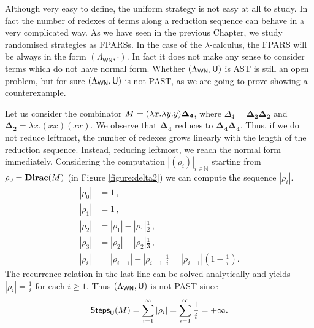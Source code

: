Although very easy to define, the uniform strategy is not easy at all to study. In fact the number of redexes of terms along a reduction sequence can behave in a very complicated way. As we have seen in the previous Chapter, we study randomised strategies as FPARSs. In the case of the $\lambda$-calculus, the FPARS will be always in the form $(\Lambda_\mathsf{WN},\cdot)$. In fact it does not make any sense to consider terms which do not have normal form. Whether $(\Lambda_\mathsf{WN},\mathsf{U})$ is AST is still an open problem, but for sure $(\Lambda_\mathsf{WN},\mathsf{U})$ is not PAST, as we are going to prove showing a counterexample. 
\begin{example}
	Let us  consider the combinator $M=(\lambda x.\lambda y.y)\bm{\Delta_4}$, where $\Delta_4=\bm{\Delta_2\Delta_2}$ and $\bm{\Delta_2}= \lambda x.(xx)(xx)$. We observe that $\bm{\Delta_4}$ reduces to $\bm{\Delta_4\Delta_4}$. Thus, if we do not reduce leftmost, the number of redexes grows linearly with the length of the reduction sequence. Instead, reducing leftmost, we reach the normal form immediately. Considering the computation $|(\rho_i)|_{i\in\mathbb{N}}$ starting from $\rho_0=\textbf{Dirac}(M)$ (in Figure \ref{figure:delta2}) we can compute the sequence $|\rho_i|$.
	\begin{equation*}
	\begin{split}
	|\rho_0|&=1\,,\\
	|\rho_1|&=1\,,\\
	|\rho_2|&=|\rho_1|-|\rho_1|\frac{1}{2}\,,\\
	|\rho_3|&=|\rho_2|-|\rho_2|\frac{1}{3}\,,\\
	|\rho_i|&=|\rho_{i-1}|-|\rho_{i-1}|\frac{1}{i}=|\rho_{i-1}|\left( 1-\frac{1}{i}\right).
	\end{split}
	\end{equation*}
	The recurrence relation in the last line can be solved analytically and yields $|\rho_i|=\frac{1}{i}$ for each $i\geq 1$. Thus $(\Lambda_\mathsf{WN},\mathsf{U})$ is not PAST since 
	$$
	\textsf{Steps}_{\mathsf{U}}(M)=\sum\limits_{i=1}^{\infty} \left|\rho_i\right|=\sum\limits_{i=1}^{\infty} \frac{1}{i}=+\infty.
	$$
\end{example}
